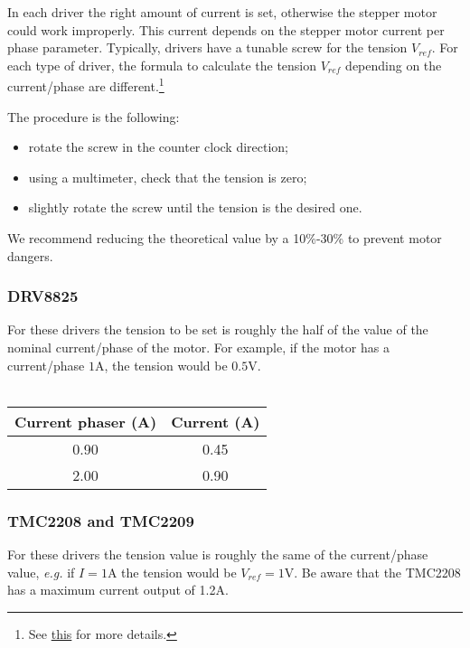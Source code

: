 In each driver the right amount of current is set, otherwise the stepper motor could work improperly.
This current depends on the stepper motor current per phase parameter.
Typically, drivers have a tunable screw for the tension \(V_{ref}\).
For each type of driver, the formula to calculate the tension \(V_{ref}\) depending on the current/phase are different.\footnote{See \href{https://all3dp.com/2/vref-calculator-tmc2209-tmc2208-a4988/}{this} for more details.}

The procedure is the following:
\begin{itemize}
    \item rotate the screw in the counter clock direction;
    \item using a multimeter, check that the tension is zero;
    \item slightly rotate the screw until the tension is the desired one.
\end{itemize}
We recommend reducing the theoretical value by a 10\%-30\% to prevent motor dangers.

\subsubsection{DRV8825}
For these drivers the tension to be set is roughly the half of the value of the nominal current/phase of the motor.
For example, if the motor has a current/phase \(1\)A, the tension would be \(0.5\)V.
\\
\\
\begin{minipage}
    {.4\textwidth}
    \centering
    \begin{tabular}{cc}
        \hline
        \textbf{Current phaser (A)} & \textbf{Current (A)} \\
        \hline
        0.90 & 0.45 \\
        2.00 & 0.90             
    \end{tabular}
    \label{tab:drivers_curr}
\end{minipage} 

\subsubsection{TMC2208 and TMC2209}
For these drivers the tension value is roughly the same of the current/phase value, \textit{e.g.} if \(I=1\)A the tension would be \(V_{ref}=1\)V.
Be aware that the TMC2208 has a maximum current output of 1.2A.

